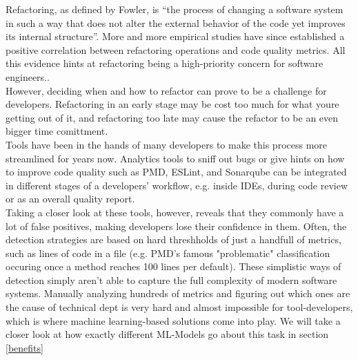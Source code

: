 Refactoring, as defined by Fowler\cite{fowler2018refactoring}, is “the process of changing a software system in such a way that does not alter the external behavior of the code yet improves its internal structure”. More and more empirical studies have since established a positive correlation between refactoring operations and code quality metrics. All this evidence hints at refactoring being a high-priority concern for software engineers.\cite{aniche2020effectiveness}.\\
However, deciding when and how to refactor can prove to be a challenge for developers. Refactoring in an early stage may be cost too much for what youre getting out of it, and refactoring too late may cause the refactor to be an even bigger time comittment.\cite{kruchten2012technical}\\
Tools have been in the hands of many developers to make this process more streamlined for years now. Analytics tools to sniff out bugs or give hints on how to improve code quality such as PMD, ESLint, and Sonarqube can be integrated in different stages of a developers' workflow, e.g. inside IDEs, during code review or as an overall quality report. \cite{aniche2020effectiveness}\\
Taking a closer look at these tools, however, reveals that they commonly have a lot of false positives, making developers lose their confidence in them. Often, the detection strategies are based on hard threshholds of just a handfull of metrics, such as lines of code in a file (e.g. PMD's famous "problematic" classification occuring once a method reaches 100 lines per default). These simplistic ways of detection simply aren't able to capture the full complexity of modern software systems.
Manually analyzing hundreds of metrics and figuring out which ones are the cause of technical dept is very hard and almost impossible for tool-developers, which is where machine learning-based solutions come into play.
We will take a closer look at how exactly different ML-Models go about this task in section \ref{benefits}
